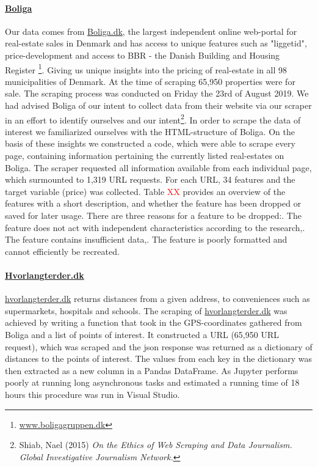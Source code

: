 \documentclass[12pt,a4paper]{article}
\begin{document}
\paragraph{\href{https://www.boliga.dk}{Boliga}\newline}
Our data comes from \href{https://www.boliga.dk}{Boliga.dk}, the largest independent online web-portal for real-estate sales in Denmark and has access to unique features such as "liggetid", price-development and access to BBR - the Danish Building and Housing Register \footnote{\href{https://www.boligagruppen.dk}{www.boligagruppen.dk}}. Giving us unique insights into the pricing of real-estate in all 98 municipalities of Denmark. At the time of scraping 65,950 properties were for sale.\newline
The scraping process was conducted on Friday the 23rd of August 2019. We had advised Boliga of our intent to collect data from their website via our scraper in an effort to identify ourselves and our intent\footnote{Shiab, Nael (2015) \textit{On the Ethics of Web Scraping and Data Journalism. Global Investigative Journalism Network.}}. In order to scrape the data of interest we familiarized ourselves with the HTML-structure of Boliga. On the basis of these insights we constructed a code, which were able to scrape every page, containing information pertaining the currently listed real-estates on Boliga. The scraper requested all information available from each individual page, which surmounted to 1,319 URL requests. \newline
For each URL, 34 features and the target variable (price) was collected. Table \textcolor{red}{XX} provides an overview of the features with a short description, and whether the feature has been dropped or saved for later usage. There are three reasons for a feature to be dropped:. The feature does not act with independent characteristics according to the research,. The feature contains insufficient data,. The feature is poorly formatted and cannot efficiently be recreated.
\paragraph{\href{https://www.hvorlangterder.dk}{Hvorlangterder.dk}\newline}
\href{https://www.hvorlangterder.dk}{hvorlangterder.dk} returns distances from a given address, to conveniences such as supermarkets, hospitals and schools.   
The scraping of \href{https://www.hvorlangterder.dk}{hvorlangterder.dk} was achieved by writing a function that took in the GPS-coordinates gathered from Boliga and a list of points of interest. It constructed a URL (65,950 URL request), which was scraped and the json response was returned as a dictionary of distances to the points of interest. The values from each key in the dictionary was then extracted as a new column in a Pandas DataFrame.\newline
As Jupyter performs poorly at running long asynchronous tasks and estimated a running time of 18 hours this procedure was run in Visual Studio.
\end{document}
